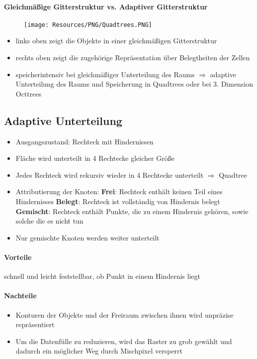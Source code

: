 \paragraph{Gleichmäßige Gitterstruktur vs. Adaptiver Gitterstruktur}
\begin{figure}[H]
	\begin{center}
		\texttt{[image: Resources/PNG/Quadtrees.PNG]}
		\caption{}
		\label{fig:PNG/Quadtrees.PNG}
	\end{center}
\end{figure}
\begin{itemize}
	\item links oben zeigt die Objekte in einer gleichmäßigen Gitterstruktur
	\item rechts oben zeigt die zugehörige Repräsentation über Belegtheiten der Zellen
	\item speicherintensiv bei gleichmäßiger Unterteilung des Raums $\Rightarrow$ adaptive Unterteilung des Raums und Speicherung in Quadtrees oder bei 3. Dimension Octtrees
\end{itemize}
\subsection{Adaptive Unterteilung}
\begin{itemize}
	\item Ausgangszustand: Rechteck mit Hindernissen
	\item Fläche wird unterteilt in 4 Rechtecke gleicher Größe
	\item Jedes Rechteck wird rekursiv wieder in 4 Rechtecke unterteilt $\Rightarrow$ Quadtree
	\item Attributierung der Knoten:
	\subitem \textbf{Frei}: Rechteck enthält keinen Teil eines Hindernisses
	\subitem \textbf{Belegt}: Rechteck ist vollständig von Hindernis belegt
	\subitem \textbf{Gemischt}: Rechteck enthält Punkte, die zu einem Hindernis gehören, sowie solche die es nicht tun
	\item Nur gemischte Knoten werden weiter unterteilt
\end{itemize}
\paragraph{Vorteile} schnell und leicht feststellbar, ob Punkt in einem Hindernis liegt
\paragraph{Nachteile}
\begin{itemize}
	\item Konturen der Objekte und der Freiraum zwischen ihnen wird unpräzise repräsentiert
	\item Um die Datenfülle zu reduzieren, wird das Raster zu grob gewählt und dadurch ein möglicher Weg durch Mischpixel versperrt
\end{itemize}
